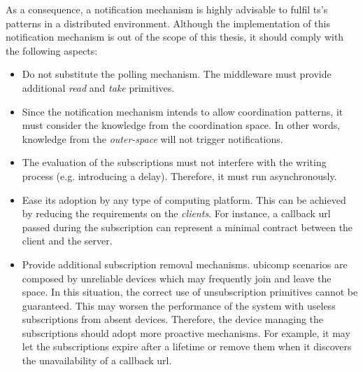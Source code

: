 As a consequence, a notification mechanism is highly advisable to fulfil \ac{ts}'s patterns in a distributed environment.
Although the implementation of this notification mechanism is out of the scope of this thesis,
it should comply with the following aspects:
\begin{itemize}
  \item Do not substitute the polling mechanism. %
        The middleware must provide additional \emph{read} and \emph{take} primitives.
  \item Since the notification mechanism intends to allow coordination patterns,
        it must consider the knowledge from the coordination space. %
        In other words, knowledge from the \emph{outer-space} will not trigger notifications. %
  \item The evaluation of the subscriptions must not interfere with the writing process (e.g. introducing a delay).
        Therefore, it must run asynchronously.
  \item Ease its adoption by any type of computing platform.
	This can be achieved by reducing the requirements on the \emph{clients}.
        For instance, a callback \ac{url} passed during the subscription can represent a minimal contract between the client and the server. %
  \item Provide additional subscription removal mechanisms.
	\ac{ubicomp} scenarios are composed by unreliable devices which may frequently join and leave the space.
	In this situation, the correct use of unsubscription primitives cannot be guaranteed.
	This may worsen the performance of the system with useless subscriptions from absent devices.
	Therefore, the device managing the subscriptions should adopt more proactive mechanisms.
	For example, it may let the subscriptions expire after a lifetime or remove them when it discovers the unavailability of a callback \ac{url}. %
\end{itemize}


